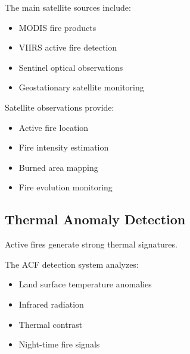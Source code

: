The main satellite sources include:

\begin{itemize}

\item MODIS fire products

\item VIIRS active fire detection

\item Sentinel optical observations

\item Geostationary satellite monitoring

\end{itemize}


Satellite observations provide:

\begin{itemize}

\item Active fire location

\item Fire intensity estimation

\item Burned area mapping

\item Fire evolution monitoring

\end{itemize}



\subsection{Thermal Anomaly Detection}

Active fires generate strong thermal signatures.

The ACF detection system analyzes:

\begin{itemize}

\item Land surface temperature anomalies

\item Infrared radiation

\item Thermal contrast

\item Night-time fire signals

\end{itemize}


